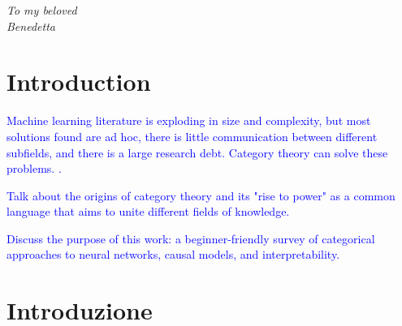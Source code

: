 \documentclass[12pt,a4paper,openright,twoside]{report}
\theoremstyle{plain}
\theoremstyle{definition}
\begin{document}
\begin{titlepage}
\thispagestyle{empty}                   
\topmargin=6.5cm                        
\raggedleft                             
\large                                  
                                       
\em                                     
To my beloved\\
Benedetta                   
\newpage                                

\clearpage{\pagestyle{empty}\cleardoublepage}
\end{titlepage}


            





\chapter*{Introduction}   




  \textcolor{blue}{Machine learning literature is exploding in size and complexity, but most solutions found are ad hoc, there is little communication between different subfields, and there is a large research debt. Category theory can solve these problems.  \cite{shieblerCategoryTheoryMachine2021}.}

  \textcolor{blue}{Talk about the origins of category theory and its "rise to power" as a common language that aims to unite different fields of knowledge.}
    
  \textcolor{blue}{Discuss the purpose of this work: a beginner-friendly survey of categorical approaches to neural networks, causal models, and interpretability.}







\chapter*{Introduzione}
\end{document}
